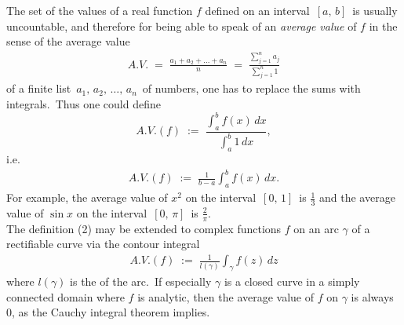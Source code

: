 \documentclass[12pt]{article}
\theoremstyle{definition}
\begin{document}
The set of the values of a real function $f$ defined on an interval \,$[a,\,b]$\, is usually uncountable, and therefore for being able to speak of an \emph{average value} of $f$ in the sense of the average value 
\begin{align}
A.V. \;=\; \frac{a_1\!+\!a_2\!+\ldots+\!a_n}{n} \;=\; \frac{\sum_{j=1}^na_j}{\sum_{j=1}^n1}
\end{align}
of a finite list \,$a_1,\,a_2,\,\ldots,\, a_n$\, of numbers, one has to replace the sums with integrals.\, Thus one could define
$$A.V.(f) \;:=\; \frac{\int_a^b\!f(x)\,dx}{\int_a^b\!1\,dx},$$
i.e.
\begin{align}
A.V.(f) \;:=\; \frac{1}{b\!-\!a}\int_a^b\!f(x)\,dx.
\end{align}
For example, the average value of $x^2$ on the interval \,$[0,\,1]$\, is $\frac{1}{3}$ and the average value of $\sin{x}$
on the interval \,$[0,\,\pi]$\, is $\frac{2}{\pi}$.\\

The definition (2) may be extended to complex functions $f$ on an arc $\gamma$ of a rectifiable curve via the contour integral
\begin{align}
A.V.(f) \;:=\; \frac{1}{l(\gamma)}\int_\gamma\!f(z)\,dz
\end{align}
where $l(\gamma)$ is the  of the arc.\, If especially $\gamma$ is a closed curve in a simply connected domain where $f$ is analytic, then the average value of $f$ on $\gamma$ is always 0, as the Cauchy integral theorem implies.


\end{document}

